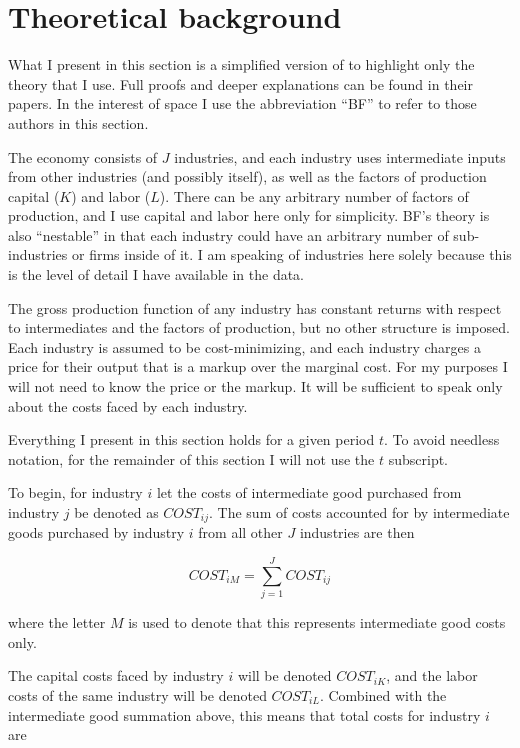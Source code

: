 \documentclass[11pt]{article}
\begin{document}
\section{Theoretical background}
What I present in this section is a simplified version of \cite{bfshortnote,bfprodge} to highlight only the theory that I use. Full proofs and deeper explanations can be found in their papers. In the interest of space I use the abbreviation ``BF'' to refer to those authors in this section.

The economy consists of $J$ industries, and each industry uses intermediate inputs from other industries (and possibly itself), as well as the factors of production capital ($K$) and labor ($L$). There can be any arbitrary number of factors of production, and I use capital and labor here only for simplicity. BF's theory is also ``nestable'' in that each industry could have an arbitrary number of sub-industries or firms inside of it. I am speaking of industries here solely because this is the level of detail I have available in the data. 

The gross production function of any industry has constant returns with respect to intermediates and the factors of production, but no other structure is imposed. Each industry is assumed to be cost-minimizing, and each industry charges a price for their output that is a markup over the marginal cost. For my purposes I will not need to know the price or the markup. It will be sufficient to speak only about the costs faced by each industry.

Everything I present in this section holds for a given period $t$. To avoid needless notation, for the remainder of this section I will not use the $t$ subscript. 

To begin, for industry $i$ let the costs of intermediate good purchased from industry $j$ be denoted as $COST_{ij}$. The sum of costs accounted for by intermediate goods purchased by industry $i$ from all other $J$ industries are then

\begin{equation}
	COST_{iM} = \sum_{j=1}^{J} COST_{ij}
\end{equation}

where the letter $M$ is used to denote that this represents intermediate good costs only.

The capital costs faced by industry $i$ will be denoted $COST_{iK}$, and the labor costs of the same industry will be denoted $COST_{iL}$. Combined with the intermediate good summation above, this means that total costs for industry $i$ are
\end{document}

